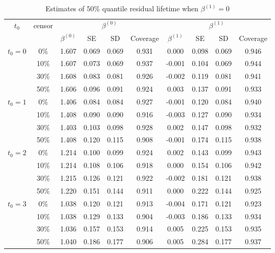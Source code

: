 \documentclass[titlepage,english,12pt]{article}
\begin{document}
	\begin{table}[H] \label{table:2}
		\caption{Estimates of $50\%$ quantile residual lifetime when $\beta^{(1)}=0$}
		\centering
		\begin{tabular}{|c|c|c|c|c|c|c|c|c|c|}
			\hline
			\multirow{2}{*}{$t_0$} & \multirow{2}{*}{censor} & \multicolumn{4}{c|}{$\beta^{(0)}$} & \multicolumn{4}{c|}{$\beta^{(1)}$}\\ \cline{3-10}
			& & $\beta^{(0)}$ & SE & SD  & Coverage  & $\beta^{(1)}$ & SE & SD & Coverage\\
			\hline\hline
			\multirow{4}{*}{$t_0=0$} & 0\% & 1.607 & 0.069 & 0.069 & 0.931 & 0.000 & 0.098 & 0.069 & 0.946 \\
			& 10\% & 1.607 & 0.073 & 0.069 & 0.937 & -0.001 & 0.104 & 0.069 & 0.944 \\
			& 30\% & 1.608 & 0.083 & 0.081 & 0.926 & -0.002 & 0.119 & 0.081 & 0.941 \\
			& 50\% & 1.606 & 0.096 & 0.091 & 0.924 & 0.003 & 0.137 & 0.091 & 0.933 \\
			\hline
			\multirow{4}{*}{$t_0=1$} & 0\% & 1.406 & 0.084 & 0.084 & 0.927 & -0.001 & 0.120 & 0.084 & 0.940 \\
			& 10\% & 1.408 & 0.090 & 0.090 & 0.916 & -0.003 & 0.127 & 0.090 & 0.934 \\
			& 30\% & 1.403 & 0.103 & 0.098 & 0.928 & 0.002 & 0.147 & 0.098 & 0.932 \\
			& 50\% & 1.408 & 0.120 & 0.115 & 0.908 & -0.001 & 0.174 & 0.115 & 0.938 \\
			\hline
			\multirow{4}{*}{$t_0=2$} & 0\% & 1.214 & 0.100 & 0.099 & 0.924 & 0.002 & 0.143 & 0.099 & 0.943 \\
			& 10\% & 1.214 & 0.108 & 0.106 & 0.918 & 0.000 & 0.154 & 0.106 & 0.942 \\
			& 30\% & 1.215 & 0.126 & 0.121 & 0.922 & -0.002 & 0.181 & 0.121 & 0.938 \\
			& 50\% & 1.220 & 0.151 & 0.144 & 0.911 & 0.000 & 0.222 & 0.144 & 0.925 \\
			\hline
			\multirow{4}{*}{$t_0=3$} & 0\% & 1.038 & 0.120 & 0.121 & 0.913 & -0.004 & 0.171 & 0.121 & 0.923 \\
			& 10\% & 1.038 & 0.129 & 0.133 & 0.904 & -0.003 & 0.186 & 0.133 & 0.934 \\
			& 30\% & 1.036 & 0.157 & 0.153 & 0.914 & 0.005 & 0.225 & 0.153 & 0.935 \\
			& 50\% & 1.040 & 0.186 & 0.177 & 0.906 & 0.005 & 0.284 & 0.177 & 0.937 \\
			\hline
		\end{tabular}
	\end{table}
			
\end{document}
